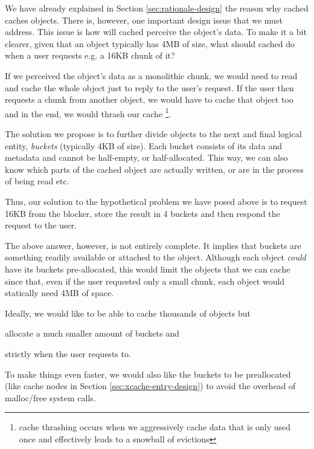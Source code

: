 
We have already explained in Section \ref{sec:rationale-design} the reason why 
cached caches objects. There is, however, one important design issue that we 
must address. This issue is how will cached perceive the object's data. To make 
it a bit clearer, given that an object typically has 4MB of size, what should 
cached do when a user requests e.g. a 16KB chunk of it?

If we perceived the object's data as a monolithic chunk, we would need to read 
and cache the whole object just to reply to the user's request. If the user 
then requests a chunk from another object, we would have to cache that object 
too and in the end, we would thrash our cache
\footnote{
	cache thrashing occurs when we aggressively cache data that is only 
	used once and effectively leads to a snowball of evictions
}.

The solution we propose is to further divide objects to the next and final 
logical entity, \emph{buckets} (typically 4KB of size). Each bucket consists of 
its data and metadata and cannot be half-empty, or half-allocated. This way, we 
can also know which parts of the cached object are actually written, or are in 
the process of being read etc.

Thus, our solution to the hypothetical problem we have posed above is to 
request 16KB from the blocker, store the result in 4 buckets and then respond 
the request to the user.

The above answer, however, is not entirely complete. It implies that buckets 
are something readily available or attached to the object. Although each object 
\textit{could} have its buckets pre-allocated, this would limit the objects 
that we can cache since that, even if the user requested only a small chunk, 
each object would statically need 4MB of space.

Ideally, we would like to be able to cache thousands of objects but
\begin{inparaenum}[(i)]
\item allocate a much smaller amount of buckets and
\item strictly when the user requests to.
\end{inparaenum}
To make things even faster, we would also like the buckets to be preallocated 
(like cache nodes in Section \ref{sec:xcache-entry-design}) to avoid the 
overhead of malloc/free system calls.

